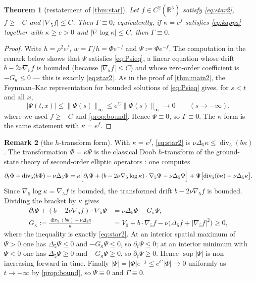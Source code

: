 \documentclass[11pt]{article}
\newtheorem{theorem}{Theorem}[section]
\theoremstyle{definition}
\newtheorem{remark}[theorem]{Remark}
\newcommand{\R}{\mathbb{R}}
\newcommand{\Div}{\operatorname{div}}
\begin{document}
\begin{theorem}[restatement of \cref{thm:star}]\label{thm:star2}
Let $f\in C^2(\R^5)$ satisfy \eqref{eq:star2}, $f\ge-C$ and
$|\nabla_5f|\le C$. Then $\Gamma\equiv0$; equivalently, if $\kappa=e^f$
satisfies \eqref{eq:kappa} together with $\kappa\ge c>0$ and
$|\nabla\log\kappa|\le C$, then $\Gamma\equiv0$.
\end{theorem}
\begin{proof}
Write $h=\rho^2e^{f}$, $w=\Gamma/h=\Phi e^{-f}$ and $\Psi:=\Phi e^{-f}$. The
computation in the remark below shows that $\Psi$ satisfies \eqref{eq:Psieq},
a linear equation whose drift $b-2\nu\nabla_5f$ is bounded (because
$|\nabla_5f|\le C$) and whose zero-order coefficient is $-G_\kappa\le0$ ---
this is exactly \eqref{eq:star2}. As in the proof of \cref{thm:main2}, the
Feynman--Kac representation for bounded solutions of \eqref{eq:Psieq} gives,
for $s<t$ and all $x$,
\begin{equation}
|\Psi(t,x)|\le\|\Psi(s)\|_\infty\le e^{C}\|\Phi(s)\|_\infty\to0
\qquad(s\to-\infty),
\end{equation}
where we used $f\ge-C$ and \cref{prop:bound}. Hence $\Psi\equiv0$, so
$\Gamma\equiv0$. The $\kappa$-form is the same statement with $\kappa=e^f$.
\end{proof}

\begin{remark}[the $h$-transform form]
With $\kappa=e^f$, \eqref{eq:star2} is
$\nu\Delta_5\kappa\le\Div_5(b\kappa)$. The transformation
$\Phi=\kappa\Psi$ is the classical Doob $h$-transform of the ground-state
theory of second-order elliptic operators \cite{Doob,Pinsky}: one computes
\begin{equation}
\partial_t\Phi+\Div_5(b\Phi)-\nu\Delta_5\Phi
=\kappa\Bigl[\partial_t\Psi+(b-2\nu\nabla_5\log\kappa)\cdot\nabla_5\Psi
-\nu\Delta_5\Psi\Bigr]+\Psi\bigl[\Div_5(b\kappa)-\nu\Delta_5\kappa\bigr].
\end{equation}
Since $\nabla_5\log\kappa=\nabla_5f$ is bounded, the transformed drift
$b-2\nu\nabla_5f$ is bounded. Dividing the bracket by $\kappa$ gives
\begin{equation}\label{eq:Psieq}
\begin{split}
\partial_t\Psi+(b-2\nu\nabla_5f)\cdot\nabla_5\Psi&=\nu\Delta_5\Psi-G_\kappa\Psi,\\
G_\kappa:=\frac{\Div_5(b\kappa)-\nu\Delta_5\kappa}{\kappa}
&=V_0+b\cdot\nabla_5f-\nu\bigl(\Delta_5f+|\nabla_5f|^2\bigr)\ge0,
\end{split}
\end{equation}
where the inequality is exactly \eqref{eq:star2}. At an interior spatial
maximum of $\Psi>0$ one has $\Delta_5\Psi\le0$ and $-G_\kappa\Psi\le0$, so
$\partial_t\Psi\le0$; at an interior minimum with $\Psi<0$ one has
$\Delta_5\Psi\ge0$ and $-G_\kappa\Psi\ge0$, so $\partial_t\Psi\ge0$. Hence
$\sup|\Psi|$ is non-increasing forward in time. Finally
$|\Psi|=|\Phi|e^{-f}\le e^{C}|\Phi|\to0$ uniformly as $t\to-\infty$ by
\cref{prop:bound}, so $\Psi\equiv0$ and $\Gamma\equiv0$.
\end{remark}
\end{document}
